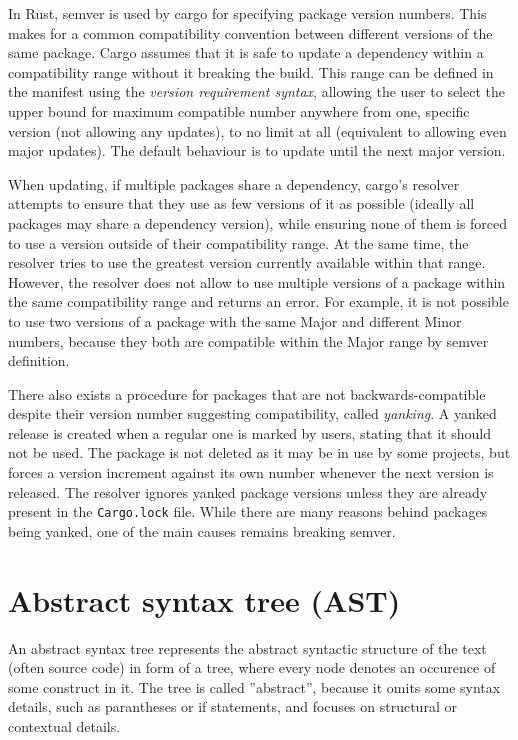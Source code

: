 \documentclass[licencjacka,en]{pracamgr}
\begin{document}
In Rust, semver is used by cargo for specifying package version numbers. This makes for a common
compatibility convention between different versions of the same package. Cargo assumes that
it is safe to update a dependency within a compatibility range without it breaking the build.
This range can be defined in the manifest using the \textit{version requirement syntax}, allowing
the user to select the upper bound for maximum compatible number anywhere from one, specific
version (not allowing any updates), to no limit at all (equivalent to allowing even major updates).
The default behaviour is to update until the next major version.

When updating, if multiple packages share a dependency, cargo's resolver attempts to ensure
that they use as few versions of it as possible (ideally all packages may share a dependency
version), while ensuring none of them is forced to use a version outside of their compatibility
range. At the same time, the resolver tries to use the greatest version currently available within
that range. However, the resolver does not allow to use multiple versions of a package within the
same compatibility range and returns an error. For example, it is not possible to use two versions
of a package with the same Major and different Minor numbers, because they both are compatible
within the Major range by semver definition.

There also exists a procedure for packages that are not backwards-compatible despite their version
number suggesting compatibility, called \textit{yanking}. A yanked release is created when
a regular one is marked by users, stating that it should not be used. The package is not deleted
as it may be in use by some projects, but forces a version increment against its own number
whenever the next version is released. The resolver ignores yanked package versions unless they are
already present in the \texttt{Cargo.lock} file. While there are many reasons behind packages being
yanked, one of the main causes remains breaking semver.

\section{Abstract syntax tree (AST)}

An abstract syntax tree represents the abstract syntactic structure of the text (often source code)
in form of a tree, where every node denotes an occurence of some construct in it. The tree is
called ''abstract'', because it omits some syntax details, such as parantheses or if statements,
and focuses on structural or contextual details.
\end{document}
